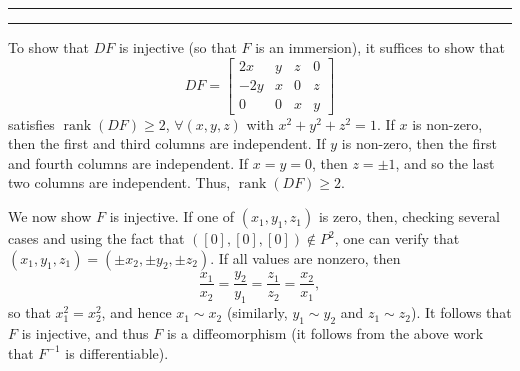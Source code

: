 \documentclass[11pt]{article}
\newcounter{questionCounter}
\newcounter{partCounter}[questionCounter]
\newenvironment{question}[2][\arabic{questionCounter}]{%
    \setcounter{partCounter}{0}%
    \vspace{.25in} \hrule \vspace{0.5em}%
        \noindent{\bf #2}%
    \vspace{0.8em} \hrule \vspace{.10in}%
    \addtocounter{questionCounter}{1}%
}{}
\newcommand{\inv}{^{-1}}                %
\newcommand{\rnk}{\operatorname{rank}}  %
\begin{document}
\begin{question}{Problem 6}
To show that $DF$ is injective (so that $F$ is an immersion), it suffices to
show that
\[DF =
    \begin{bmatrix}
        2x  & y & z & 0 \\
        -2y & x & 0 & z \\
        0   & 0 & x & y
    \end{bmatrix}
\]
satisfies $\rnk(DF) \geq 2$, $\forall (x,y,z)$ with $x^2 + y^2 + z^2 = 1$. If
$x$ is non-zero, then the first and third columns are independent. If $y$ is
non-zero, then the first and fourth columns are independent. If $x = y = 0$,
then $z = \pm1$, and so the last two columns are independent. Thus,
$\rnk(DF) \geq 2$.

We now show $F$ is injective.
If one of $(x_1,y_1,z_1)$ is zero, then, checking several cases and using the
fact that $([0],[0],[0]) \notin P^2$, one can verify that
$(x_1,y_1,z_1) = (\pm x_2,\pm y_2,\pm z_2)$. If all values are nonzero, then
\[\frac{x_1}{x_2} = \frac{y_2}{y_1} = \frac{z_1}{z_2} = \frac{x_2}{x_1},\]
so that $x_1^2 = x_2^2$, and hence $x_1 \sim x_2$ (similarly, $y_1 \sim y_2$
and $z_1 \sim z_2$). It follows that $F$ is injective, and thus $F$ is a
diffeomorphism (it follows from the above work that $F\inv$ is differentiable).
\end{question}
\end{document}
